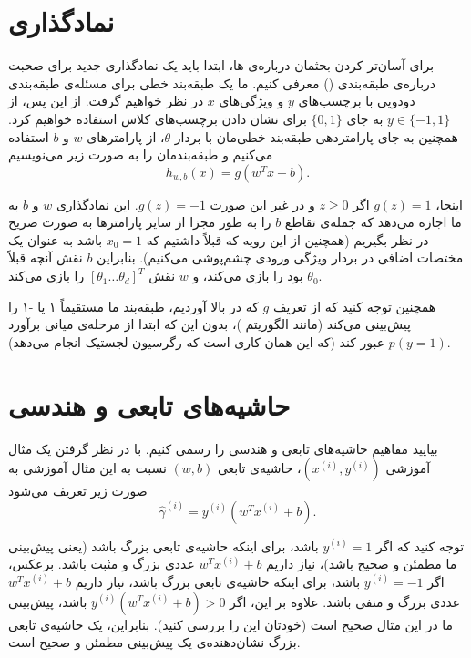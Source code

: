 \documentclass[12pt]{article}
\begin{document}
\section{نمادگذاری}
برای آسان‌تر کردن بحثمان درباره‌ی
ها، ابتدا باید یک نمادگذاری جدید برای صحبت درباره‌ی طبقه‌بندی 
()
معرفی کنیم. ما یک طبقه‌بند خطی برای مسئله‌ی طبقه‌بندی دودویی با برچسب‌های
$y$
و ویژگی‌های
$x$
در نظر خواهیم گرفت. از این پس، از
$y \in \{-1, 1\}$
به جای
$\{0, 1\}$
برای نشان دادن برچسب‌های کلاس استفاده خواهیم کرد. همچنین به جای پارامتردهی طبقه‌بند خطی‌مان با بردار
$\theta$،
از پارامترهای
$w$
و
$b$
استفاده می‌کنیم و طبقه‌بندمان را به صورت زیر می‌نویسیم
$$h_{w,b}(x) = g(w^T x + b).$$

اینجا،
$g(z) = 1$
اگر
$z \geq 0$
و در غیر این صورت
$g(z) = -1$.
این نمادگذاری
$w$
و
$b$
به ما اجازه می‌دهد که جمله‌ی تقاطع
$b$
را به طور مجزا از سایر پارامترها به صورت صریح در نظر بگیریم (همچنین از این رویه که قبلاً داشتیم که
$x_0 = 1$
باشد به عنوان یک مختصات اضافی در بردار ویژگی ورودی چشم‌پوشی می‌کنیم). بنابراین
$b$
نقش آنچه قبلاً
$\theta_0$
بود را بازی می‌کند، و
$w$
نقش
$[\theta_1 \ldots \theta_d]^T$
را بازی می‌کند.

همچنین توجه کنید که از تعریف
$g$
که در بالا آوردیم، طبقه‌بند ما مستقیماً ۱ یا -۱ را پیش‌بینی می‌کند (مانند الگوریتم
)،
بدون این که ابتدا از مرحله‌ی میانی برآورد
$p(y = 1)$
عبور کند (که این همان کاری است که رگرسیون لجستیک انجام می‌دهد).

\section{حاشیه‌های تابعی و هندسی}
بیایید مفاهیم حاشیه‌های تابعی و هندسی را رسمی کنیم. با در نظر گرفتن یک مثال آموزشی
$(x^{(i)}, y^{(i)})$،
حاشیه‌ی تابعی
$(w, b)$
نسبت به این مثال آموزشی به صورت زیر تعریف می‌شود
$$\hat{\gamma}^{(i)} = y^{(i)} (w^T x^{(i)} + b).$$

توجه کنید که اگر
$y^{(i)} = 1$
باشد، برای اینکه حاشیه‌ی تابعی بزرگ باشد (یعنی پیش‌بینی ما مطمئن و صحیح باشد)، نیاز داریم
$w^T x^{(i)} + b$
عددی بزرگ و مثبت باشد. برعکس، اگر
$y^{(i)} = -1$
باشد، برای اینکه حاشیه‌ی تابعی بزرگ باشد، نیاز داریم
$w^T x^{(i)} + b$
عددی بزرگ و منفی باشد. علاوه بر این، اگر
$y^{(i)} (w^T x^{(i)} + b) > 0$
باشد، پیش‌بینی ما در این مثال صحیح است (خودتان این را بررسی کنید). بنابراین، یک حاشیه‌ی تابعی بزرگ نشان‌دهنده‌ی یک پیش‌بینی مطمئن و صحیح است.
\end{document}
